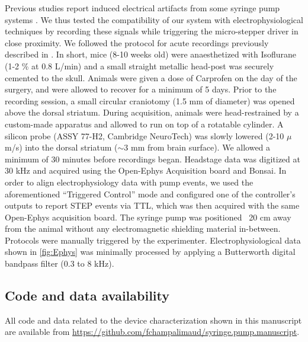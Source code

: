 Previous studies report induced electrical artifacts from some syringe pump systems \citep{Amarante2019}. We thus tested the compatibility of our system with electrophysiological techniques by recording these signals while triggering the micro-stepper driver in close proximity.
We followed the protocol for acute recordings previously described in \citep{Cruz2022}. In short, mice (8-10 weeks old) were anaesthetized with Isoflurane (1-2 \% at 0.8 L/min) and a small straight metallic head-post was securely cemented to the skull. Animals were given a dose of Carprofen on the day of the surgery, and were allowed to recover for a minimum of 5 days. Prior to the recording session, a small circular craniotomy (1.5 mm of diameter) was opened above the dorsal striatum. During acquisition, animals were head-restrained by a custom-made apparatus and allowed to run on top of a rotatable cylinder. A silicon probe (ASSY 77-H2, Cambridge NeuroTech) was slowly lowered (2-10 $\mu$m/s) into the dorsal striatum ($\sim$3 mm from brain surface). We allowed a minimum of 30 minutes before recordings began. Headstage data was digitized at 30 kHz and acquired using the Open-Ephys Acquisition board and Bonsai. In order to align electrophysiology data with pump events, we used the aforementioned “Triggered Control” mode and configured one of the controller’s outputs to report STEP events via TTL, which was then acquired with the same Open-Ephys acquisition board. The syringe pump was positioned ~20 cm away from the animal without any electromagnetic shielding material in-between. Protocols were manually triggered by the experimenter.
Electrophysiological data shown in \cref{fig:Ephys} was minimally processed by applying a Butterworth digital bandpass filter (0.3 to 8 kHz).

\subsection{Code and data availability}
All code and data related to the device characterization shown in this manuscript are available from \url{https://github.com/fchampalimaud/syringe.pump.manuscript}.


